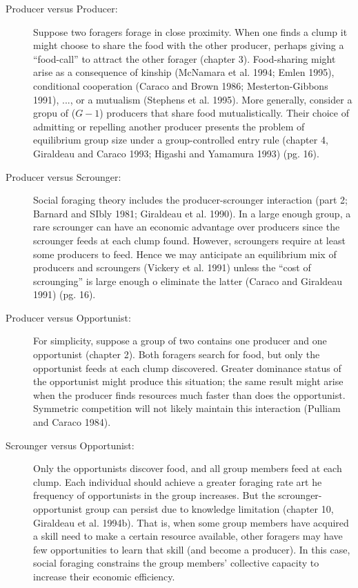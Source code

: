 \documentclass[a4paper,11pt]{article}
\begin{document}
\begin{enumerate}
\begin{description}
\item[Producer versus Producer:] Suppose two foragers forage in close proximity. When one finds  a clump it might choose to share the food with the other producer, perhaps giving a ``food-call'' to attract the other forager (chapter 3). Food-sharing might arise as a consequence of kinship (McNamara et al. 1994; Emlen 1995), conditional cooperation (Caraco and Brown 1986; Mesterton-Gibbons 1991), ..., or a mutualism (Stephens et al. 1995). More generally, consider a gropu of ($G-1$) producers that share food mutualistically. Their choice of admitting or repelling another producer presents the problem of equilibrium group size under a group-controlled entry rule (chapter 4, Giraldeau and Caraco 1993; Higashi and Yamamura 1993) (pg. 16). 
\item[Producer versus Scrounger:] Social foraging theory includes the producer-scrounger interaction (part 2; Barnard and SIbly 1981; Giraldeau et al. 1990). In a large enough group, a rare scrounger can have an economic advantage over producers since the scrounger feeds at each clump found. However, scroungers require at least some producers to feed. Hence we may anticipate an equilibrium mix of producers and scroungers (Vickery et al. 1991) unless the ``cost of scrounging'' is large enough o eliminate the latter (Caraco and Giraldeau 1991) (pg. 16). 
\item[Producer versus Opportunist:] For simplicity, suppose a group of two contains one producer and one opportunist (chapter 2). Both foragers search for food, but only the opportunist feeds at each clump discovered. Greater dominance status of the opportunist might produce this situation; the same result might arise when the producer finds resources much faster than does the opportunist. Symmetric competition will not likely maintain this interaction (Pulliam and Caraco 1984). 
\item[Scrounger versus Opportunist:] Only the opportunists discover food, and all group members feed at each clump. Each individual should achieve a greater foraging rate art he frequency of opportunists in the group increases. But the scrounger-opportunist group can persist due to knowledge limitation (chapter 10, Giraldeau et al. 1994b). That is, when some group members have acquired a skill need to make a certain resource available, other foragers may have few opportunities to learn that skill (and become a producer). In this case, social foraging constrains the group members' collective capacity to increase their economic efficiency. 

\end{description}
\end{enumerate}
\end{document}
